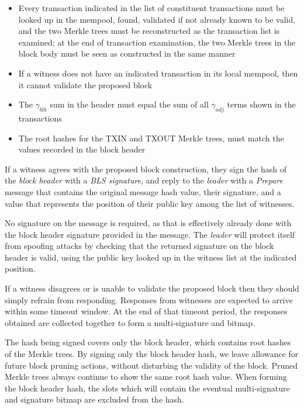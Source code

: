 \documentclass[8pt,fleqn,openany]{book}
\begin{document}
\begin{itemize}
{\begin{itemize}
      \item {Every transaction indicated in the list of constituent transactions must be looked up in the mempool, found, validated if not already known to be valid, and the two Merkle trees must be reconstructed as the transaction list is examined; at the end of transaction examination, the two Merkle trees in the block body must be seen as constructed in the same manner}
      \item {If a witness does not have an indicated transaction in its local mempool, then it cannot validate the proposed block}
      \item {The $\gamma_{blk}$ sum in the header must equal the sum of all $\gamma_{adj}$ terms shown in the transactions}
      \item {The root hashes for the TXIN and TXOUT Merkle trees, must match the values recorded in the block header}
    \end{itemize}

  \item{If a witness agrees with the proposed block construction, they sign the hash of the \textit{block header} with a \textit{BLS signature}, and reply to the \textit{leader} with a \textit{Prepare} message that contains the original message hash value, their signature, and a value that represents the position of their public key among the list of witnesses. 

  No signature on the message is required, as that is effectively already done with the block header signature provided in the message. The \textit{leader} will protect itself from spoofing attacks by checking that the returned signature on the block header is valid, using the public key looked up in the witness list at the indicated position.}

  \item{If a witness disagrees or is unable to validate the proposed block then they should simply refrain from responding. Responses from witnesses are expected to arrive within some timeout window. At the end of that timeout period, the responses obtained are collected together to form a multi-signature and bitmap.}

  \item{The hash being signed covers only the block header, which contains root hashes of the Merkle trees. By signing only the block header hash, we leave allowance for future block pruning actions, without disturbing the validity of the block. Pruned Merkle trees always continue to show the same root hash value. When forming the block header hash, the slots which will contain the eventual multi-signature and signature bitmap are excluded from the hash.}

}
\end{itemize}
\end{document}
